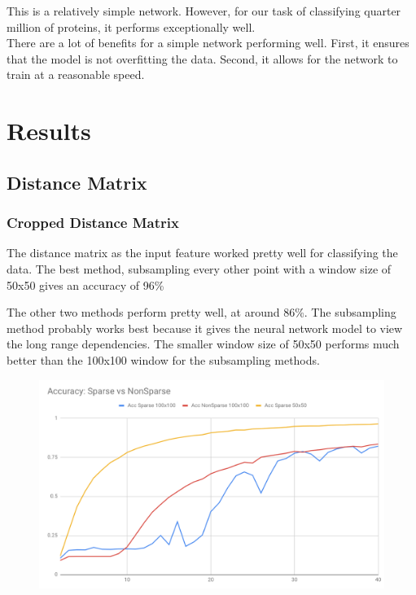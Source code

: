 \documentclass[12pt, a4paper, twocolumn, fullpage]{article}
\theoremstyle{plain}
\theoremstyle{definition}
\theoremstyle{remark}
\begin{document}
This is a relatively simple network. However, for our task of classifying quarter million of proteins, it performs exceptionally well. 
\\
There are a lot of benefits for a simple network performing well. First, it ensures that the model is not overfitting the data. Second, it allows for the network to train at a reasonable speed.


\section{Results}

\subsection{Distance Matrix}

\subsubsection{Cropped Distance Matrix}
    The distance matrix as the input feature worked pretty well for classifying the data. The best method, subsampling every other point with a window size of 50x50 gives an accuracy of 96\%
    
    The other two methods perform pretty well, at around 86\%.
    The subsampling method probably works best because it gives the neural network model to view the long range dependencies.
    The smaller window size of 50x50 performs much better than the 100x100 window for the subsampling methods.  
    
    \begin{figure}[t]
      \includegraphics[width=\linewidth]{AccSparsevsNonSparse.png}
      \caption{}
      \label{AccSparsevsNonSparse}
    \end{figure}
    
\end{document}
